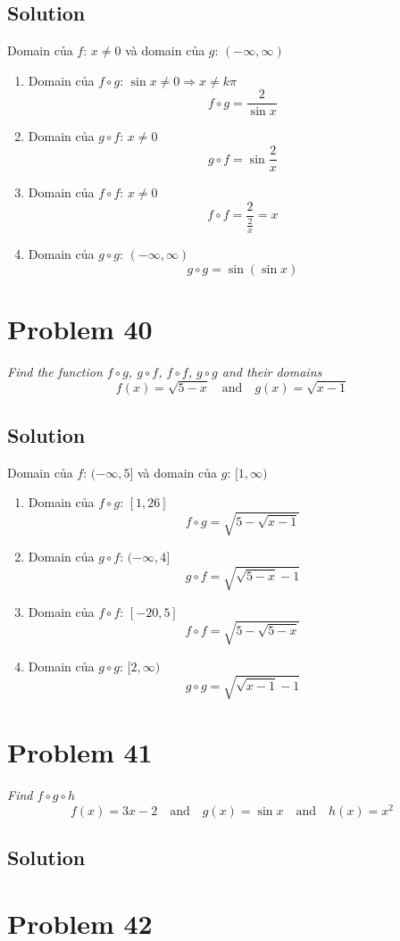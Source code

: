 \documentclass[11pt]{article}
\newcommand{\soln}{\subsection*}
\newcommand{\qn}{\textit}
\begin{document}
\soln{Solution}
Domain của $f$: $x \ne 0$ và domain của $g$: $(-\infty, \infty)$
\begin{enumerate}
	\item Domain của $f \circ g$: $\sin{x} \ne 0 \Rightarrow x \ne k\pi $ $$f \circ g=\frac{2}{\sin{x}}$$
	
	\item Domain của $g \circ f$: $x \ne 0$ $$g \circ f=\sin{\frac{2}{x}}$$
	
	\item Domain của $f \circ f$: $x \ne 0$ $$f \circ f=\frac{2}{\frac{2}{x}}=x$$
	
	\item Domain của $g \circ g$: $(-\infty, \infty)$ $$g \circ g=\sin(\sin{x})$$
\end{enumerate}

\section*{Problem 40}

\qn{Find the function $f \circ g$, $g \circ f$, $f \circ f$, $g \circ g$ and their domains $$f(x)=\sqrt{5-x} \quad \text{and} \quad g(x)=\sqrt{x-1}$$}

\soln{Solution}
Domain của $f$: $(-\infty, 5]$ và domain của $g$: $[1, \infty)$
\begin{enumerate}
	\item Domain của $f \circ g$: $[1, 26]$ $$f \circ g=\sqrt{5-\sqrt{x-1}}$$
	
	\item Domain của $g \circ f$: $(-\infty, 4]$ $$g \circ f=\sqrt{\sqrt{5-x}-1}$$
	
	\item Domain của $f \circ f$: $[-20, 5]$ $$f \circ f=\sqrt{5-\sqrt{5-x}}$$
	
	\item Domain của $g \circ g$: $[2, \infty)$ $$g \circ g=\sqrt{\sqrt{x-1}-1}$$
\end{enumerate}

\section*{Problem 41}

\qn{Find $f \circ g \circ h$ $$f(x)=3x-2 \quad \text{and} \quad g(x)=\sin{x} \quad \text{and} \quad h(x)=x^2$$}

\soln{Solution}

\section*{Problem 42}
\end{document}
